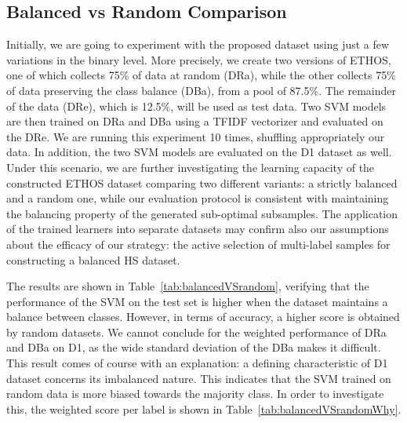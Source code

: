 \documentclass{article}
\begin{document}
\subsection{Balanced vs Random Comparison}

Initially, we are going to experiment with the proposed dataset using just a few variations in the binary level. More precisely, we create two versions of ETHOS, one of which collects 75\% of data at random (DRa), while the other collects 75\% of data preserving the class balance (DBa), from a pool of 87.5\%. The remainder of the data (DRe), which is 12.5\%, will be used as test data. Two SVM models are then trained on DRa and DBa using a TFIDF vectorizer and evaluated on the DRe. We are running this experiment 10 times, shuffling appropriately our data. In addition, the two SVM models are evaluated on the D1 dataset as well. Under this scenario, we are further investigating the learning capacity of the constructed ETHOS dataset comparing two different variants: a strictly balanced and a random one, while our evaluation protocol is consistent with maintaining the balancing property of the generated sub-optimal subsamples. The application of the trained learners into separate datasets may confirm also our assumptions about the efficacy of our strategy: the active selection of multi-label samples for constructing a balanced HS dataset.

The results are shown in Table~\ref{tab:balancedVSrandom}, verifying that the performance of the SVM on the test set is higher when the dataset maintains a balance between classes. However, in terms of accuracy, a higher score is obtained by random datasets. We cannot conclude for the  weighted performance of DRa and DBa on D1, as the wide standard deviation of the DBa makes it difficult. This result comes of course with an explanation: a defining characteristic of D1 dataset concerns its imbalanced nature. This indicates that the SVM trained on random data is more biased towards the majority class. In order to investigate this, the weighted  score per label is shown in Table~\ref{tab:balancedVSrandomWhy}. 
\end{document}
